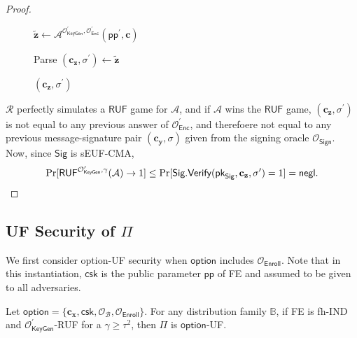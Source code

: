 \begin{proof}
\begin{figure}[h]
\begin{minipage}[t]{0.5\linewidth}
\begin{algorithm}[H]
\begin{algorithmic}[1]
		\State $\mathbf{\tilde{z}} \gets {\mathcal{A}}^{\mathcal{O}_{\textsf{KeyGen}}^\prime, \mathcal{O}_{\textsf{Enc}}^\prime } (\textsf{pp}^\prime, \mathbf{c})$ \label{alg:red:ind-uf-OB-Enroll:A}

		\State Parse $(\mathbf{c_z}, \sigma^\prime) \gets \mathbf{\tilde{z}}$

		\State \Return $(\mathbf{c_z}, \sigma^\prime)$
	\end{algorithmic}
	\end{algorithm}
	\end{minipage}
	
\end{figure}

$\mathcal{R}$ perfectly simulates a $\textsf{RUF}$ game for $\mathcal{A}$, and if $\mathcal{A}$ wins the $\textsf{RUF}$ game, $(\mathbf{c_z}, \sigma^\prime)$ is not equal to any previous answer of $\mathcal{O}_{\textsf{Enc}}^\prime$, and therefoere not equal to any previous message-signature pair $(\mathbf{c_y}, \sigma)$ given from the signing oracle $\mathcal{O}_{\textsf{Sign}}$. Now, since $\textsf{Sig}$ is sEUF-CMA,
\[
	\Pr[\textsf{RUF}^{ \mathcal{O}^\prime_{\textsf{KeyGen}}, \gamma}(\mathcal{A}) \to 1] \leq \Pr[ \textsf{Sig.Verify}(\textsf{pk}_{\textsf{Sig}}, \mathbf{c_z}, \sigma^\prime) = 1 ] = \mathsf{negl}.
\]


\end{proof}



\subsection{UF Security of $\Pi$}
\label{sec:security_analysis:fh-IPFE:uf}

We first consider \textsf{option}-UF security when $\textsf{option}$ includes $\mathcal{O}_\textsf{Enroll}$. Note that in this instantiation, $\textsf{csk}$ is the public parameter $\textsf{pp}$ of \textsf{FE} and assumed to be given to all adversaries. 

\begin{theorem}
\label{thm:fh-IPFE:ind-uf-OB-Enroll}
	Let $\textsf{option} = \{ \mathbf{c_x}, \textsf{csk}, \mathcal{O}_\mathcal{B}, \mathcal{O}_{\textsf{Enroll}} \}$. For any distribution family $\mathbb{B}$, if \textsf{FE} is fh-IND and $\mathcal{O}^\prime_{\textsf{KeyGen}}$-RUF for a $\gamma \geq \tau^2$, then $\Pi$ is $\textsf{option}$-UF. 
\end{theorem}


